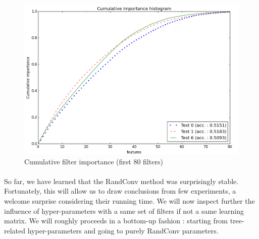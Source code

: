 \documentclass[a4paper]{report}
\begin{document}
		\begin{figure}
			\centering
				\includegraphics[width=1.0\textwidth]{images/FIGVarCumHist.png}
			\caption{\label{fig:FIGVarCumHist}Cumulative filter importance (first 80 filters)}
		\end{figure}
		
		\paragraph{}
		So far, we have learned that the RandConv method was surprisingly stable. Fortunately, this will allow us to draw conclusions from few experiments, a welcome surprise considering their running time. We will now inspect further the influence of hyper-parameters with a same set of filters if not a same learning matrix. We will roughly proceeds in a bottom-up fashion : starting from tree-related hyper-parameters and going to purely RandConv parameters.
		
		
\end{document}
